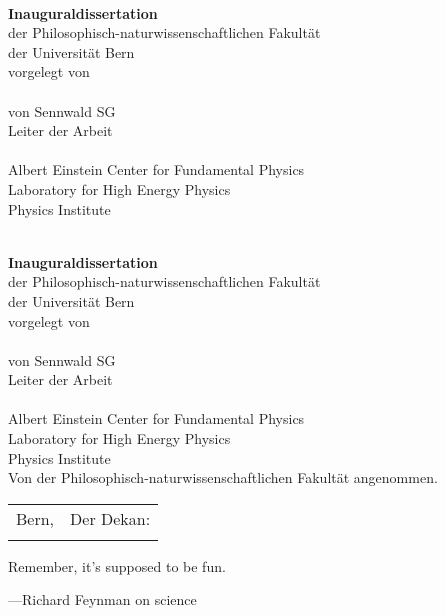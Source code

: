 \begin{titlepage}
	\begin{center}
		\null
		\vfill
		\textbf{\LARGE\Title}\\[20mm]
		\textbf{\large Inauguraldissertation}\\
		{\large der Philosophisch-naturwissenschaftlichen Fakultät}\\
		{\large der Universität Bern}\\[20mm]
		{\large vorgelegt von}\\[10mm]
		\textbf{\Large\Author}\\[10mm]
		{\large von Sennwald SG}\\[20mm]
		{\large Leiter der Arbeit}\\
		\textbf{\large\Supervisor}\\[10mm]
		{\large Albert Einstein Center for Fundamental Physics}\\
		{\large Laboratory for High Energy Physics}\\
		{\large Physics Institute}\\
		\vfill
	\end{center}
\end{titlepage}
\cleardoublepage
\begin{titlepage}
	\begin{center}
		\null
		\vfill
		\textbf{\LARGE\Title}\\[20mm]
		\textbf{\large Inauguraldissertation}\\
		{\large der Philosophisch-naturwissenschaftlichen Fakultät}\\
		{\large der Universität Bern}\\[20mm]
		{\large vorgelegt von}\\[10mm]
		\textbf{\Large\Author}\\[10mm]
		{\large von Sennwald SG}\\[20mm]
		{\large Leiter der Arbeit}\\
		\textbf{\large\Supervisor}\\[10mm]
		{\large Albert Einstein Center for Fundamental Physics}\\
		{\large Laboratory for High Energy Physics}\\
		{\large Physics Institute}\\[10mm]
		{\large Von der Philosophisch-naturwissenschaftlichen Fakultät angenommen.}\\[10mm]
		\begin{tabu} to 
			{\large Bern, \Date} &	{\large Der Dekan:} \\
			&						{\large\Dean}
		\end{tabu}
		\vfill
	\end{center}
\end{titlepage}
\cleardoublepage
\thispagestyle{empty}
Remember, it's supposed to be fun.

\bigskip

---Richard Feynman on science
\cleardoublepage